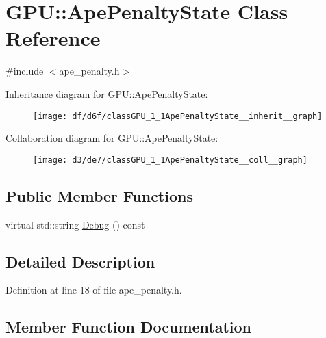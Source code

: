\hypertarget{classGPU_1_1ApePenaltyState}{}\section{G\+PU\+:\+:Ape\+Penalty\+State Class Reference}
\label{classGPU_1_1ApePenaltyState}


{\ttfamily \#include $<$ape\+\_\+penalty.\+h$>$}



Inheritance diagram for G\+PU\+:\+:Ape\+Penalty\+State\+:
\nopagebreak
\begin{figure}[H]
\begin{center}
\leavevmode
\texttt{[image: df/d6f/classGPU\_1\_1ApePenaltyState\_\_inherit\_\_graph]}
\end{center}
\end{figure}


Collaboration diagram for G\+PU\+:\+:Ape\+Penalty\+State\+:
\nopagebreak
\begin{figure}[H]
\begin{center}
\leavevmode
\texttt{[image: d3/de7/classGPU\_1\_1ApePenaltyState\_\_coll\_\_graph]}
\end{center}
\end{figure}
\subsection*{Public Member Functions}
\begin{DoxyCompactItemize}
\item 
virtual std\+::string \hyperlink{classGPU_1_1ApePenaltyState_a67100edd4d354aacb582bb5ebec34165}{Debug} () const 
\end{DoxyCompactItemize}


\subsection{Detailed Description}


Definition at line 18 of file ape\+\_\+penalty.\+h.



\subsection{Member Function Documentation}
